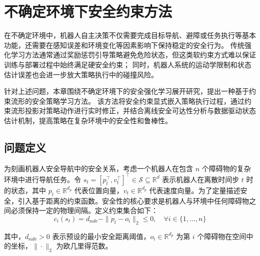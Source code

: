 \chapter{不确定环境下安全约束方法}

在不确定环境中，机器人自主决策不仅需要完成目标导航、避障或任务执行等基本功能，还需要在感知误差和环境变化等因素影响下保持稳定的安全行为。
传统强化学习方法通常通过奖励惩罚引导策略避免危险状态，但这类软约束方式难以保证训练与部署过程中始终满足硬安全约束；
同时，机器人系统的运动学限制和状态估计误差也会进一步放大策略执行中的碰撞风险。

针对上述问题，本章围绕不确定环境下的安全强化学习展开研究，提出一种基于约束流形的安全策略学习方法。
该方法将安全约束显式嵌入策略执行过程，通过约束流形投影对策略动作进行实时修正，并结合离线安全可达性分析与数据驱动状态估计机制，提高策略在复杂环境中的安全性和鲁棒性。

\section{问题定义}
为刻画机器人安全导航中的安全关系，考虑一个机器人在包含 $n$ 个障碍物的复杂环境中进行导航任务。令 $s_t = [p_t^\top, v_t^\top]^\top \in \mathcal{S} \subseteq \mathbb{R}^d$ 表示机器人在离散时间步 $t$ 时的状态，其中 $p_t \in \mathbb{R}^{d_p}$ 代表位置向量，$v_t \in \mathbb{R}^{d_p}$ 代表速度向量。为了定量描述安全，引入基于距离的约束函数。安全性的核心要求是机器人与环境中任何障碍物之间必须保持一定的物理间隔。定义约束集合如下：
\begin{equation}
    c_i(s_t) = d_{\text{safe}} - \|p_t - o_i\|_2 \leq 0, \quad \forall i \in \{1, \ldots, n\}
\end{equation}

其中，$d_{\text{safe}} > 0$ 表示预设的最小安全距离阈值，$o_i \in \mathbb{R}^{d_p}$ 为第 $i$ 个障碍物在空间中的坐标，$\|\cdot\|_2$ 为欧几里得范数。

